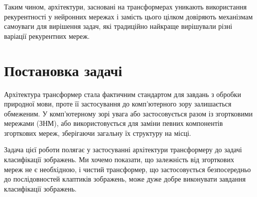 Таким чином, архітектури, засновані на трансформерах
уникають використання рекурентності у нейронних мережах і замість
цього цілком довіряють механізмам самоуваги для
вирішення задач, які традиційно найкраще вирішували
різні варіації рекурентних мереж.

\section{Постановка задачі}
Архітектура трансформер стала фактичним стандартом
для завдань з обробки природної мови, проте її застосування
до комп'ютерного зору залишається обмеженим. У комп'ютерному
зорі увага або застосовується разом із згортковими мережами (ЗНМ),
або використовується для заміни певних компонентів
згорткових мереж, зберігаючи загальну їх структуру на місці.

Задача цієї роботи полягає у застосуванні архітектури
трансформеру до задачі класифікації зображень. Ми хочемо показати,
що залежність від згорткових мереж не є необхідною, і чистий
трансформер, що застосовується безпосередньо до послідовностей
клаптиків зображень, може дуже добре виконувати
завдання класифікації зображень.